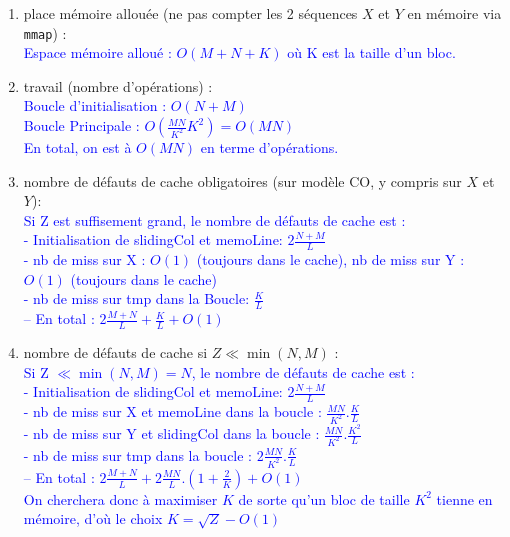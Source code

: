 \documentclass[10pt,a4paper]{article}
\begin{document}
\begin{enumerate}
  \item place mémoire allouée (ne pas compter les 2 séquences $X$ et $Y$ en mémoire via {\tt mmap}) : \\
  \textcolor{blue}{
    Espace mémoire alloué : $O(M+N+K)$ où K est la taille d'un bloc.
  }
  \item travail (nombre d'opérations) : \\
  \textcolor{blue}{
    Boucle d'initialisation : $O(N + M)$ \\
    Boucle Principale       : $O(\frac{MN}{K^{2}} K^{2}) = O(MN)$  \\
    En total, on est à $O(MN)$ en terme d'opérations.
  }
  \item nombre de défauts de cache obligatoires (sur modèle CO, y compris sur $X$ et $Y$): \\
  \textcolor{blue}{
    Si Z est suffisement grand, le nombre de défauts de cache est : \\
    - Initialisation de slidingCol et memoLine: $2 \frac{N+M}{L}$ \\
    - nb de miss sur X : $O(1)$ (toujours dans le cache), nb de miss sur Y : $O(1)$ (toujours dans le cache) \\
    - nb de miss sur tmp dans la Boucle: $\frac{K}{L}$ \\
    -- En total :  $2 \frac{M + N}{L} + \frac{K}{L} + O(1)$
  }
  \item nombre de défauts de cache si $Z \ll \min(N,M)$ : \\
  \textcolor{blue}{
    Si Z $\ll \min(N,M) = N$, le nombre de défauts de cache est : \\
    - Initialisation de slidingCol et memoLine: $2 \frac{N+M}{L}$ \\
    - nb de miss sur X et memoLine dans la boucle : $\frac{MN}{K^{2}} . \frac{K}{L}$ \\
    - nb de miss sur Y et slidingCol dans la boucle : $\frac{MN}{K^{2}} . \frac{K^{2}}{L}$  \\
    - nb de miss sur tmp dans la boucle : $2 \frac{MN}{K^{2}} . \frac{K}{L}$ \\
    -- En total :  $2 \frac{M + N}{L} + 2 \frac{MN}{L} . (1 + \frac{2}{K}) + O(1)$ \\
    On cherchera donc à maximiser $K$ de sorte qu'un bloc de taille $K^{2}$ tienne en mémoire, d'où le choix $K = \sqrt{Z} - O(1)$
  }
\end{enumerate}

\end{document}
